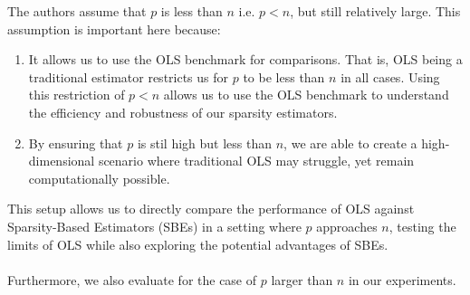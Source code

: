 The authors assume that $p$ is less than $n$ i.e. $p < n$, but still relatively large. This assumption is important here because:
\begin{enumerate}
    \item It allows us to use the OLS benchmark for comparisons. That is, OLS being a traditional estimator restricts us for $p$ to be less than $n$ in all cases. Using this restriction of $p < n$ allows us to use the OLS benchmark to understand the efficiency and robustness of our sparsity estimators. 
    \item By ensuring that $p$ is stil high but less than $n$, we are able to create a high-dimensional scenario where traditional OLS may struggle, yet remain computationally possible. 
\end{enumerate}
This setup allows us to directly compare the performance of OLS against Sparsity-Based Estimators (SBEs) in a setting where $p$ approaches $n$, testing the limits of OLS while also exploring the potential advantages of SBEs. \\
\\
Furthermore, we also evaluate for the case of $p$ larger than $n$ in our experiments.